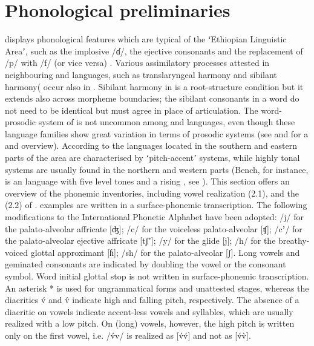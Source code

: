 \documentclass[output=paper]{LSP/langsci}
\begin{document}
\section{Phonological preliminaries} \label{sec:Petrollino:2}
 displays phonological features which are typical of the ʻEthiopian Linguistic Areaʼ, such as the implosive /ɗ/, the ejective consonants and the replacement of /p/ with /f/ (or vice versa) \citep{Ferguson1970,Ferguson1976,CrassMeyer2008}. Various assimilatory processes attested in neighbouring  and  languages, such as translaryngeal harmony and sibilant harmony(\citep{Hayward1988} occur also in . Sibilant harmony in  is a root-structure condition but it extends also across morpheme boundaries; the sibilant consonants in a word do not need to be identical but must agree in place of articulation. The word-prosodic system of  is not uncommon among  and  languages, even though these language families show great variation in terms of prosodic systems (see \citealt{Mous2012} and \citealt{Azeb2012} for a  and  overview). According to \citet[438]{Azeb2012} the languages located in the southern and eastern parts of the  area are characterised by ʻpitch-accentʼ systems, while highly tonal systems are usually found in the northern and western parts (Bench, for instance, is an  language with five level tones and a rising , see \citealt{Rapold2006}). \newline
This section offers an overview of the phonemic inventories, including vowel realization (2.1), and the  (2.2) of .  examples are written in a surface-phonemic transcription. The following modifications to the International Phonetic Alphabet have been adopted: /j/ for the palato-alveolar affricate [ʤ]; /c/ for the voiceless palato-alveolar [ʧ]; /cʼ/ for the palato-alveolar ejective affricate [tʃʼ]; /y/ for the glide [j]; /h/ for the breathy-voiced glottal approximant [ɦ]; /sh/ for the palato-alveolar [ʃ]. Long vowels and geminated consonants are indicated by doubling the vowel or the consonant symbol. Word initial glottal stop is not written in surface-phonemic transcription. An asterisk * is used for ungrammatical forms and unattested stages, whereas the diacritics v́ and v̂ indicate high and falling pitch, respectively. The absence of a diacritic on vowels indicate accent-less vowels and syllables, which are usually realized with a low pitch. On  (long) vowels, however, the high pitch is written only on the first vowel, i.e. /v́v/ is realized as [v́v́] and not as [v́v̀].   
\end{document}
